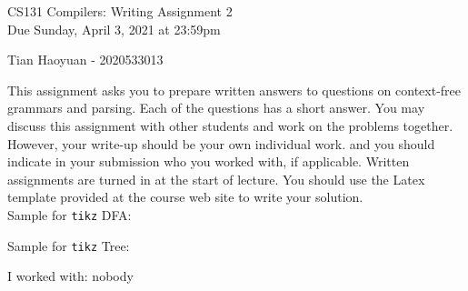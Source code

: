\documentclass[10pt]{exam}
\begin{document}
\begin{center}
  \Large CS131 Compilers: Writing Assignment 2\\Due Sunday, April 3, 2021 at 23:59pm
\end{center}

\begin{center}
  \LARGE Tian Haoyuan - 2020533013
\end{center}

This assignment asks you to prepare written answers to questions on
context-free grammars and parsing. Each of the questions has a short answer. You
may discuss this assignment with other students and work on the problems
together. However, your write-up should be your own individual work.
and you should indicate in your submission who you worked with, if applicable.
Written assignments are turned in at the start of lecture.
You should use the Latex template provided at the course web site to write your solution.
\\
Sample for \texttt{tikz} DFA:

\begin{center}\end{center}
Sample for \texttt{tikz} Tree:
\begin{center}\end{center}
\begin{center}
  I worked with: nobody
\end{center}
\end{document}
